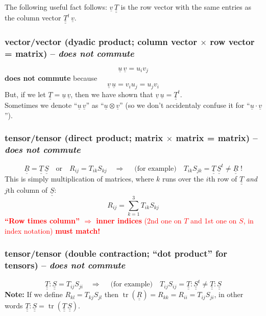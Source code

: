 \documentclass{article}
\DeclareMathOperator{\tr}{tr}
\begin{document}
The following useful fact follows:  $\underline{v}\,\underline{\underline{T}}$ is the row vector with the same entries as the column vector $\underline{\underline{T}}^t\,\underline{v}$.

\subsubsection{vector/vector (dyadic product; column vector $\times$ row vector = matrix) -- \textit{does not commute}}
\[
	\underline{u}\,\underline{v} = u_i v_j
\]
\textbf{does not commute} because
\[
	\underline{v}\,\underline{u} = v_i u_j = u_j v_i
\]
But, if we let $\underline{\underline{T}} =  \underline{u}\,\underline{v}$, then we have shown that $ \underline{v}\,\underline{u} = \underline{\underline{T}}^t$.\\
Sometimes we denote ``$\underline{u}\,\underline{v}$'' as ``$\underline{u}\otimes\underline{v}$'' (so we don't accidentaly confuse it for ``$\underline{u}\cdot\underline{v}$'').

\subsubsection{tensor/tensor (direct product; matrix $\times$ matrix = matrix) -- \textit{does not commute}}
\[
	\underline{\underline{R}} = \underline{\underline{T}}\,\underline{\underline{S}} \quad\text{or}\quad R_{ij} = T_{ik}S_{kj} \quad\Rightarrow\quad\;\text{(for example)}\quad T_{ik}S_{jk} = \underline{\underline{T}}\,\underline{\underline{S}}^t \ne \underline{\underline{R}} \; !
\]
This is simply multiplication of matrices, where $k$ runs over the $i$th row of $\underline{\underline{T}}$ \emph{and} $j$th column of $\underline{\underline{S}}$:
\[
	R_{ij} = \sum_{k=1}^3 T_{ik} S_{kj}
\]
\textcolor{red}{\textbf{``Row times column'' $\Rightarrow$ inner indices} (2nd one on $T$ and 1st one on $S$, in index notation) \textbf{must match!}}

\subsubsection{tensor/tensor (double contraction; ``dot product'' for tensors) -- \textit{does not commute}}
\[
	\underline{\underline{T}} : \underline{\underline{S}} = T_{ij} S_{ji} \quad\Rightarrow\quad\;\text{(for example)}\quad T_{ij} S_{ij} = \underline{\underline{T}} : \underline{\underline{S}}^t \ne \underline{\underline{T}} : \underline{\underline{S}}
\]
\textbf{Note:} If we define $R_{kl} = T_{kj} S_{jl}$ then $\tr(\underline{\underline{R}}) = R_{kk} = R_{ii} = T_{ij} S_{ji}$, in other words $ \underline{\underline{T}} :  \underline{\underline{S}} = \tr( \underline{\underline{T}}\, \underline{\underline{S}})$.
\end{document}
